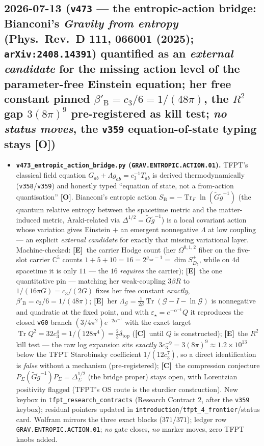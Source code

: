 \documentclass[11pt]{article}
\providecommand{\mE}{\textbf{[E]}}\providecommand{\mC}{\textbf{[C]}}
\providecommand{\mO}{\textbf{[O]}}\providecommand{\mX}{\textbf{[X]}}
\providecommand{\cthree}{c_3}\providecommand{\phiz}{\varphi_0^{\mathrm{ret}}}
\providecommand{\gcar}{g_{\mathrm{car}}}\providecommand{\Nfam}{N_{\mathrm{fam}}}
\begin{document}
\subsection*{2026-07-13 (\texttt{v473} --- the entropic-action bridge: Bianconi's \emph{Gravity from entropy} (Phys.\ Rev.\ D 111, 066001 (2025); \texttt{arXiv:2408.14391}) quantified as an \emph{external candidate} for the missing action level of the parameter-free Einstein equation; her free constant pinned $\beta'_{\mathrm B}=\cthree/6=1/(48\pi)$, the $R^2$ gap $3(8\pi)^9$ pre-registered as kill test; \emph{no status moves}, the \texttt{v359} equation-of-state typing stays \mO)}
\begin{itemize}[leftmargin=1.5em]
\item \textbf{\texttt{v473\_entropic\_action\_bridge.py} (\texttt{GRAV.ENTROPIC.ACTION.01}).} TFPT's
classical field equation $G_{ab}+\Lambda g_{ab}=\cthree^{-1}T_{ab}$ is derived thermodynamically
(\texttt{v358}/\texttt{v359}) and honestly typed ``equation of state, not a from-action quantisation''
\mO. Bianconi's entropic action $S_{\mathrm B}=-\operatorname{Tr}_F\ln(\widetilde G\widetilde g^{-1})$
(the quantum relative entropy between the spacetime metric and the matter-induced metric, Araki-related
via $\Delta^{1/2}=\widetilde G\widetilde g^{-1}$) is a local covariant action whose variation gives
Einstein $+$ an emergent nonnegative $\Lambda$ at low coupling --- an explicit \emph{external candidate}
for exactly that missing variational layer. Machine-checked: \mE\ the carrier Hodge count (her
$\Omega^{0,1,2}$ fiber on the five-slot carrier $\mathbb C^5$ counts $1{+}5{+}10{=}16{=}2^{\gcar-1}
{=}\dim S^+_{D_5}$, while on $4$d spacetime it is only $11$ --- the $16$ \emph{requires} the carrier);
\mE\ the one quantitative pin --- matching her weak-coupling $3\beta R$ to $1/(16\pi G)=\cthree/(2G)$
fixes her free constant \emph{exactly}, $\beta'_{\mathrm B}=\cthree/6=1/(48\pi)$; \mE\ her
$\Lambda_{\mathcal G}=\tfrac1{2\beta}\operatorname{Tr}(\mathcal G-I-\ln\mathcal G)$ is nonnegative and
quadratic at the fixed point, and with $\varepsilon_\star=e^{-\alpha^{-1}}Q$ it reproduces the closed
\texttt{v60} branch $(3/4\pi^2)e^{-2\alpha^{-1}}$ with the exact target $\operatorname{Tr}Q^2=
32\cthree^4=1/(128\pi^4)=\tfrac23\delta_{\mathrm{top}}$ (\mC\ until $Q$ is constructed); \mE\ the
$R^2$ kill test --- the raw log expansion sits \emph{exactly} $3\cthree^{-9}=3(8\pi)^9\approx
1.2\times10^{13}$ below the TFPT Starobinsky coefficient $1/(12\cthree^7)$, so a direct identification
is \emph{false} without a mechanism (pre-registered); \mC\ the compression conjecture
$P_\Sigma(\widetilde G\widetilde g^{-1})P_\Sigma=\Delta_\Sigma^{1/2}$ (the bridge proper) stays open,
with Lorentzian positivity flagged (TFPT's OS route is the sturdier construction). New keybox in
\texttt{tfpt\_research\_contracts} (Research Contract 2, after the \texttt{v359} keybox); residual
pointers updated in \texttt{introduction}/\texttt{tfpt\_4\_frontier}/status card. Wolfram mirrors the
three exact blocks ($371/371$); ledger row \texttt{GRAV.ENTROPIC.ACTION.01}; \emph{no} gate closes,
\emph{no} marker moves, zero TFPT knobs added.
\end{itemize}
\end{document}
